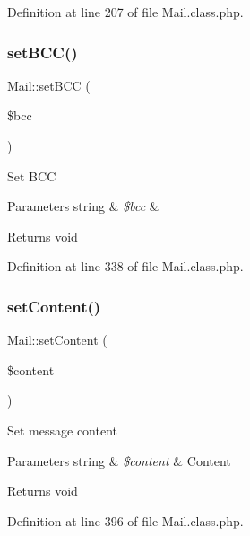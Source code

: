 Definition at line 207 of file Mail.\+class.\+php.

\hypertarget{classMail_a13267ee2cbaef851020cb3bf833437e8}{}\label{classMail_a13267ee2cbaef851020cb3bf833437e8} 
\subsubsection{\texorpdfstring{set\+B\+C\+C()}{setBCC()}}
{\footnotesize\ttfamily Mail\+::set\+B\+CC (\begin{DoxyParamCaption}\item[{}]{\$bcc }\end{DoxyParamCaption})}

Set B\+CC


\begin{DoxyParams}[1]{Parameters}
string & {\em \$bcc} & \\
\hline
\end{DoxyParams}
\begin{DoxyReturn}{Returns}
void 
\end{DoxyReturn}


Definition at line 338 of file Mail.\+class.\+php.

\hypertarget{classMail_a2112ae431d2a140d8624b943cf0eace9}{}\label{classMail_a2112ae431d2a140d8624b943cf0eace9} 
\subsubsection{\texorpdfstring{set\+Content()}{setContent()}}
{\footnotesize\ttfamily Mail\+::set\+Content (\begin{DoxyParamCaption}\item[{}]{\$content }\end{DoxyParamCaption})}

Set message content


\begin{DoxyParams}[1]{Parameters}
string & {\em \$content} & Content \\
\hline
\end{DoxyParams}
\begin{DoxyReturn}{Returns}
void 
\end{DoxyReturn}


Definition at line 396 of file Mail.\+class.\+php.

\hypertarget{classMail_a326329d653ba8e831c724471189e41e3}{}\label{classMail_a326329d653ba8e831c724471189e41e3} 
